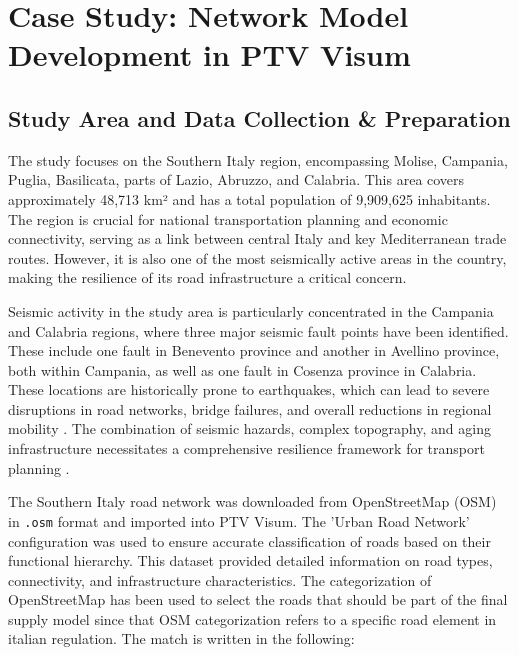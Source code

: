 \chapter{Case Study: Network Model Development in PTV Visum}

\section{Study Area and Data Collection \& Preparation}
The study focuses on the Southern Italy region, encompassing Molise, Campania, Puglia, Basilicata, parts of Lazio, Abruzzo, and Calabria. This area covers approximately 48,713 km² and has a total population of 9,909,625 inhabitants. The region is crucial for national transportation planning and economic connectivity, serving as a link between central Italy and key Mediterranean trade routes. However, it is also one of the most seismically active areas in the country, making the resilience of its road infrastructure a critical concern.

Seismic activity in the study area is particularly concentrated in the Campania and Calabria regions, where three major seismic fault points have been identified. These include one fault in Benevento province and another in Avellino province, both within Campania, as well as one fault in Cosenza province in Calabria. These locations are historically prone to earthquakes, which can lead to severe disruptions in road networks, bridge failures, and overall reductions in regional mobility \cite{Tang2011}. The combination of seismic hazards, complex topography, and aging infrastructure necessitates a comprehensive resilience framework for transport planning \cite{Gu2020}.


The Southern Italy road network was downloaded from OpenStreetMap (OSM) in \texttt{.osm} format and imported into PTV Visum. The 'Urban Road Network' configuration was used to ensure accurate classification of roads based on their functional hierarchy. This dataset provided detailed information on road types, connectivity, and infrastructure characteristics.
The categorization of OpenStreetMap has been used to select the roads that should be part of the final supply model since that OSM categorization refers to a specific road element in italian regulation. The match is written in the following: 

